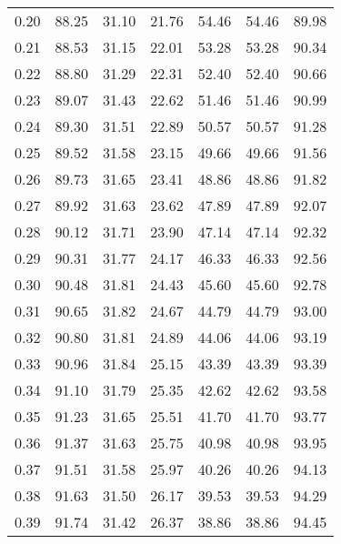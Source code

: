 \begin{tabular}{|c|c|c|c|c|c|c|}
      0.20 &     88.25 &     31.10 &      21.76 &   54.46 &      54.46 &         89.98 \\
      0.21 &     88.53 &     31.15 &      22.01 &   53.28 &      53.28 &         90.34 \\
      0.22 &     88.80 &     31.29 &      22.31 &   52.40 &      52.40 &         90.66 \\
      0.23 &     89.07 &     31.43 &      22.62 &   51.46 &      51.46 &         90.99 \\
      0.24 &     89.30 &     31.51 &      22.89 &   50.57 &      50.57 &         91.28 \\
      0.25 &     89.52 &     31.58 &      23.15 &   49.66 &      49.66 &         91.56 \\
      0.26 &     89.73 &     31.65 &      23.41 &   48.86 &      48.86 &         91.82 \\
      0.27 &     89.92 &     31.63 &      23.62 &   47.89 &      47.89 &         92.07 \\
      0.28 &     90.12 &     31.71 &      23.90 &   47.14 &      47.14 &         92.32 \\
      0.29 &     90.31 &     31.77 &      24.17 &   46.33 &      46.33 &         92.56 \\
      0.30 &     90.48 &     31.81 &      24.43 &   45.60 &      45.60 &         92.78 \\
      0.31 &     90.65 &     31.82 &      24.67 &   44.79 &      44.79 &         93.00 \\
      0.32 &     90.80 &     31.81 &      24.89 &   44.06 &      44.06 &         93.19 \\
      0.33 &     90.96 &     31.84 &      25.15 &   43.39 &      43.39 &         93.39 \\
      0.34 &     91.10 &     31.79 &      25.35 &   42.62 &      42.62 &         93.58 \\
      0.35 &     91.23 &     31.65 &      25.51 &   41.70 &      41.70 &         93.77 \\
      0.36 &     91.37 &     31.63 &      25.75 &   40.98 &      40.98 &         93.95 \\
      0.37 &     91.51 &     31.58 &      25.97 &   40.26 &      40.26 &         94.13 \\
      0.38 &     91.63 &     31.50 &      26.17 &   39.53 &      39.53 &         94.29 \\
      0.39 &     91.74 &     31.42 &      26.37 &   38.86 &      38.86 &         94.45 \\

\end{tabular}
